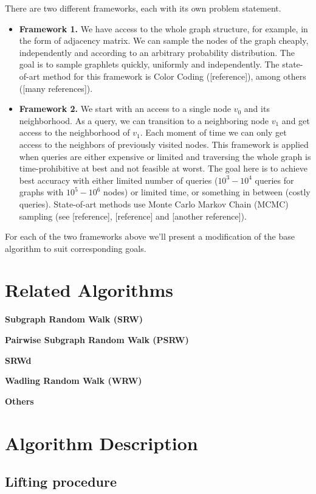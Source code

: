 \documentclass[11pt]{article}
\theoremstyle{remark}
\theoremstyle{definition}
\begin{document}
	There are two different frameworks, each with its own problem statement.
	\begin{itemize}
		\item \textbf{Framework 1.} We have access to the whole graph structure, for 
		example, in the form of adjacency matrix. We can sample the nodes of the graph
		cheaply, independently and according to an arbitrary probability distribution. The 
		goal is to sample graphlets quickly, uniformly and independently. The 
		state-of-art method for this framework is Color Coding ([reference]), among others 
		([many references]).
		\item \textbf{Framework 2.} We start with an access to a single node $v_0$ and its 
		neighborhood. As a query, we can transition to a neighboring node $v_1$ and
		get access to the neighborhood of $v_1$. Each moment of time we can only
		get access to the neighbors of previously visited nodes. 
		This framework is applied 
		when queries are either expensive or limited and traversing the whole graph is 
		time-prohibitive at best and not feasible at worst. 
		The goal here is to achieve best accuracy with either limited number of 
		queries ($10^3-10^4$ queries for graphs with $10^5-10^6$ nodes) or limited 
		time, or something in between (costly queries).
		State-of-art methods use Monte Carlo Markov 
		Chain (MCMC) sampling (see [reference], [reference] and [another reference]).
	\end{itemize}
	
	For each of the two frameworks above we'll present a modification of the base algorithm
	to suit corresponding goals.
	
	\section{Related Algorithms}
	
	\textbf{Subgraph Random Walk (SRW)}
	
	\noindent
	\textbf{Pairwise Subgraph Random Walk (PSRW)}
	
	\noindent
	\textbf{SRWd}
	
	\noindent
	\textbf{Wadling Random Walk (WRW)}
	
	\noindent
	\textbf{Others}
	
	\section{Algorithm Description}
	\subsection{Lifting procedure}
	
\end{document}
